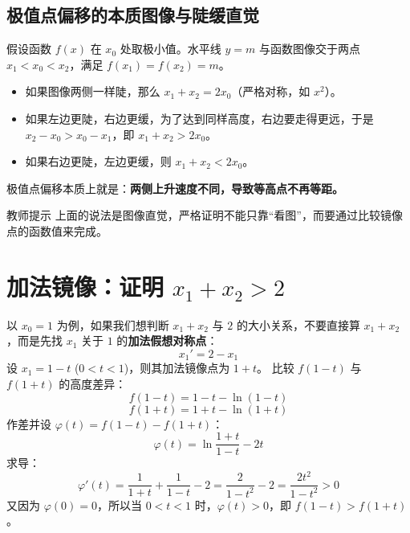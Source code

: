 \documentclass[11pt,a4paper]{ctexart}
\begin{document}
\begin{center}
\end{center}

\subsection{极值点偏移的本质图像与陡缓直觉}
假设函数 $f(x)$ 在 $x_0$ 处取极小值。水平线 $y=m$ 与函数图像交于两点 $x_1<x_0<x_2$，满足 $f(x_1)=f(x_2)=m$。
\begin{itemize}
    \item 如果图像两侧一样陡，那么 $x_1+x_2=2x_0$（严格对称，如 $x^2$）。
    \item 如果左边更陡，右边更缓，为了达到同样高度，右边要走得更远，于是 $x_2-x_0>x_0-x_1$，即 $x_1+x_2>2x_0$。
    \item 如果右边更陡，左边更缓，则 $x_1+x_2<2x_0$。
\end{itemize}
极值点偏移本质上就是：\textbf{两侧上升速度不同，导致等高点不再等距。}

\begin{keybox}{教师提示}
上面的说法是图像直觉，严格证明不能只靠“看图”，而要通过比较镜像点的函数值来完成。
\end{keybox}

\section{加法镜像：证明 $x_1+x_2>2$}
以 $x_0=1$ 为例，如果我们想判断 $x_1+x_2$ 与 $2$ 的大小关系，不要直接算 $x_1+x_2$，而是先找 $x_1$ 关于 $1$ 的\textbf{加法假想对称点}：
\[
x_1'=2-x_1
\]
设 $x_1=1-t$ ($0<t<1$)，则其加法镜像点为 $1+t$。
比较 $f(1-t)$ 与 $f(1+t)$ 的高度差异：
\[
f(1-t) = 1-t-\ln(1-t)
\]
\[
f(1+t) = 1+t-\ln(1+t)
\]
作差并设 $\varphi(t) = f(1-t)-f(1+t)$：
\[
\varphi(t) = \ln\frac{1+t}{1-t}-2t
\]
求导：
\[
\varphi'(t) = \frac{1}{1+t} + \frac{1}{1-t} - 2 = \frac{2}{1-t^2} - 2 = \frac{2t^2}{1-t^2} > 0
\]
又因为 $\varphi(0)=0$，所以当 $0<t<1$ 时，$\varphi(t)>0$，即 $f(1-t)>f(1+t)$。
\end{document}
